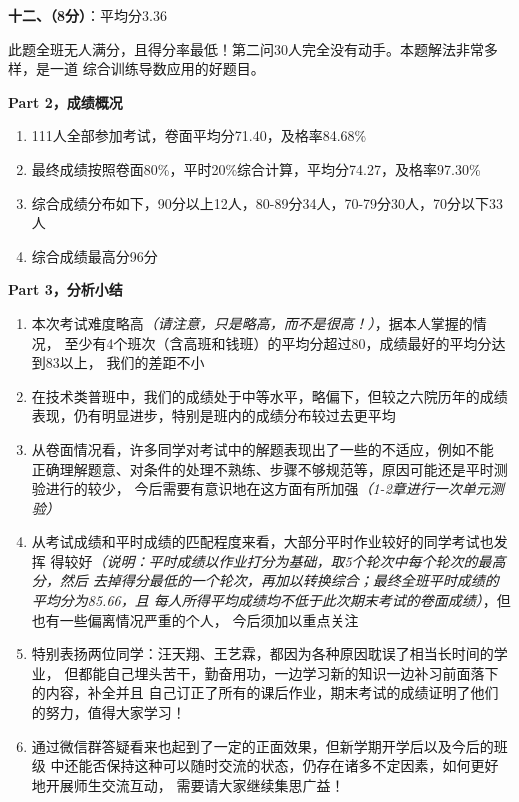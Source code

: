 {\bf 十二、（8分）}：平均分3.36

此题全班无人满分，且得分率最低！第二问30人完全没有动手。本题解法非常多样，是一道
综合训练导数应用的好题目。

\bigskip
{\large\bf Part 2，成绩概况}

\begin{enumerate}[(1)]
  \setlength{\itemindent}{1cm}
  \item 111人全部参加考试，卷面平均分71.40，及格率84.68\%
  \item 最终成绩按照卷面80\%，平时20\%综合计算，平均分74.27，及格率97.30\%
  \item 综合成绩分布如下，90分以上12人，80-89分34人，70-79分30人，70分以下33人
  \item 综合成绩最高分96分
\end{enumerate}

\bigskip
{\large\bf Part 3，分析小结}

\begin{enumerate}[(1)]
  \setlength{\itemindent}{1cm}
  \item 本次考试难度略高{\it （请注意，只是略高，而不是很高！）}，据本人掌握的情况，
  至少有4个班次（含高班和钱班）的平均分超过80，成绩最好的平均分达到83以上，
  我们的差距不小
  \item 在技术类普班中，我们的成绩处于中等水平，略偏下，但较之六院历年的成绩
  表现，仍有明显进步，特别是班内的成绩分布较过去更平均
  \item 从卷面情况看，许多同学对考试中的解题表现出了一些的不适应，例如不能
  正确理解题意、对条件的处理不熟练、步骤不够规范等，原因可能还是平时测验进行的较少，
  今后需要有意识地在这方面有所加强{\it （1-2章进行一次单元测验）}
  \item 从考试成绩和平时成绩的匹配程度来看，大部分平时作业较好的同学考试也发挥
  得较好{\it （说明：平时成绩以作业打分为基础，取5个轮次中每个轮次的最高分，然后
  去掉得分最低的一个轮次，再加以转换综合；最终全班平时成绩的平均分为85.66，且
  每人所得平均成绩均不低于此次期末考试的卷面成绩）}，但也有一些偏离情况严重的个人，
  今后须加以重点关注
  \item 特别表扬两位同学：汪天翔、王艺霖，都因为各种原因耽误了相当长时间的学业，
  但都能自己埋头苦干，勤奋用功，一边学习新的知识一边补习前面落下的内容，补全并且
  自己订正了所有的课后作业，期末考试的成绩证明了他们的努力，值得大家学习！
  \item 通过微信群答疑看来也起到了一定的正面效果，但新学期开学后以及今后的班级
  中还能否保持这种可以随时交流的状态，仍存在诸多不定因素，如何更好地开展师生交流互动，
  需要请大家继续集思广益！
\end{enumerate}


